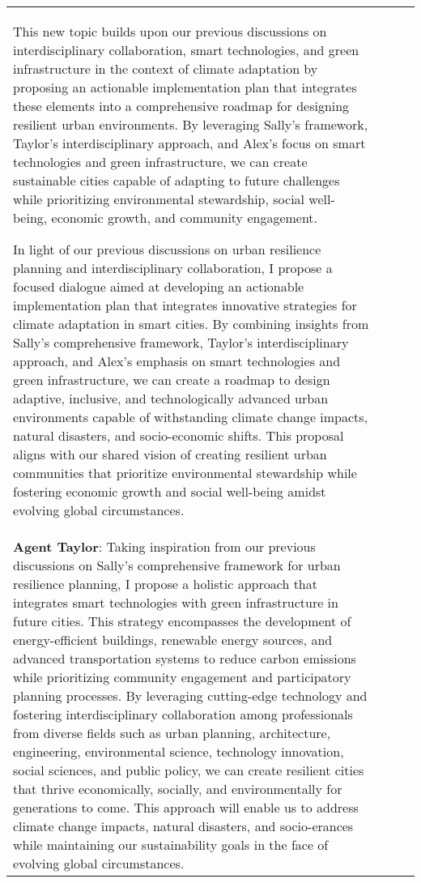 \documentclass{article}
\begin{document}
\begin{appendix}
\begin{tabular}{| m{2cm} | m{3cm} | m{5cm} | m{5cm} |}
This new topic builds upon our previous discussions on interdisciplinary collaboration, smart technologies, and green infrastructure in the context of climate adaptation by proposing an actionable implementation plan that integrates these elements into a comprehensive roadmap for designing resilient urban environments. By leveraging Sally's framework, Taylor's interdisciplinary approach, and Alex's focus on smart technologies and green infrastructure, we can create sustainable cities capable of adapting to future challenges while prioritizing environmental stewardship, social well-being, economic growth, and community engagement.

In light of our previous discussions on urban resilience planning and interdisciplinary collaboration, I propose a focused dialogue aimed at developing an actionable implementation plan that integrates innovative strategies for climate adaptation in smart cities. By combining insights from Sally's comprehensive framework, Taylor's interdisciplinary approach, and Alex's emphasis on smart technologies and green infrastructure, we can create a roadmap to design adaptive, inclusive, and technologically advanced urban environments capable of withstanding climate change impacts, natural disasters, and socio-economic shifts. This proposal aligns with our shared vision of creating resilient urban communities that prioritize environmental stewardship while fostering economic growth and social well-being amidst evolving global circumstances. \\ 
\textbf{Agent Taylor}: Taking inspiration from our previous discussions on Sally's comprehensive framework for urban resilience planning, I propose a holistic approach that integrates smart technologies with green infrastructure in future cities. This strategy encompasses the development of energy-efficient buildings, renewable energy sources, and advanced transportation systems to reduce carbon emissions while prioritizing community engagement and participatory planning processes. By leveraging cutting-edge technology and fostering interdisciplinary collaboration among professionals from diverse fields such as urban planning, architecture, engineering, environmental science, technology innovation, social sciences, and public policy, we can create resilient cities that thrive economically, socially, and environmentally for generations to come. This approach will enable us to address climate change impacts, natural disasters, and socio-erances while maintaining our sustainability goals in the face of evolving global circumstances. \\ 

\end{tabular}
\end{appendix}
\end{document}
